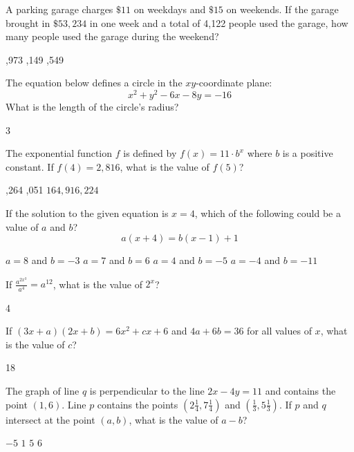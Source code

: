 \question[1]
A parking garage charges $\$11$ on weekdays and $\$15$ on weekends. If the garage brought in $\$53,234$ in one week and a total of 4,122 people used the garage, how many people used the garage during the weekend?
\begin{choices}
  ,973
  ,149
  ,549
\end{choices}





\newpage


\question[1]
The equation below defines a circle in the $xy$-coordinate plane:
\[
  x^2 + y^2 - 6x - 8y = -16
\]
What is the length of the circle's radius?
\begin{solution}
3
\end{solution}



\question[1]
The exponential function $f$ is defined by $f(x) = 11 \cdot b^x$ where $b$ is a positive constant. If $f(4) = 2,816$, what is the value of $f(5)$?
\begin{choices}
  ,264
  ,051
  \choice $164,916,224$
\end{choices}

\question[1]
If the solution to the given equation is $x = 4$, which of the following could be a value of $a$ and $b$?
\[
  a(x + 4) = b(x - 1) + 1
\]
\begin{choices}
  \choice $a = 8$ and $b = -3$
  \choice $a = 7$ and $b = 6$
  \choice $a = 4$ and $b = -5$
  \CorrectChoice $a = -4$ and $b = -11$
\end{choices}


\newpage



\question[1]
If $\frac{a^{2x^3}}{a^4} = a^{12}$, what is the value of $2^x$?
\begin{solution}
4
\end{solution}

\question[1]
If $(3x + a)(2x + b) = 6x^2 + c x + 6$ and $4a + 6b = 36$ for all values of $x$, what is the value of $c$?
\begin{solution}
18
\end{solution}

\question[1]
The graph of line $q$ is perpendicular to the line $2x - 4y = 11$ and contains the point $(1, 6)$. Line $p$ contains the points $\left(2 \frac{1}{4}, 7 \frac{1}{4}\right)$ and $\left(\frac{1}{3}, 5 \frac{1}{3}\right)$. If $p$ and $q$ intersect at the point $(a, b)$, what is the value of $a - b$?
\begin{choices}
  \CorrectChoice $-5$
  \choice $1$
  \choice $5$
  \choice $6$
\end{choices}



